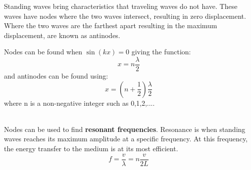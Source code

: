 \documentclass[11pt]{article}
\begin{document}
    \noindent Standing waves bring characteristics that traveling waves do not have.
    These waves have nodes where the two waves intersect, resulting in zero displacement.
    Where the two waves are the farthest apart resulting in the maximum displacement, are known as
    antinodes.
    \newline
    \hfill
    \begin{minipage}[b]{0.68\textwidth}
       Nodes can be found when $\sin(kx) = 0$ giving the function:
        \begin{equation}
            x = n \frac{\lambda}{2} \tag{node position}
        \end{equation}
        and antinodes can be found using:
        \begin{equation}
            x = (n + \frac{1}{2})\frac{\lambda}{2} \tag{antinode position}
        \end{equation}
        where n is a non-negative integer such as 0,1,2,....
    \end{minipage}

    \noindent \\ Nodes can be used to find \textbf{resonant frequencies}.
    Resonance is when standing waves reaches its maximum amplitude at a specific
    frequency.
    At this frequency, the energy transfer to the medium is at its most efficient.
    \begin{equation}
        f = \frac{v}{\lambda} = n \frac{v}{2L} \tag{Resonant frequency}
    \end{equation}
\end{document}
